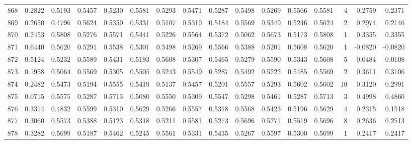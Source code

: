 \begin{tabular}{lrrrrrrrrrrrrrrr}
868 &      0.2822 &  0.5193 &  0.5457 &  0.5230 &  0.5581 &  0.5293 &  0.5471 &  0.5287 &  0.5498 &  0.5269 &   0.5566 &     0.5581 &      4 &                    0.2759 &                     0.2371 \\
869 &      0.2650 &  0.4796 &  0.5624 &  0.5350 &  0.5331 &  0.5107 &  0.5319 &  0.5184 &  0.5569 &  0.5349 &   0.5246 &     0.5624 &      2 &                    0.2974 &                     0.2146 \\
870 &      0.2453 &  0.5808 &  0.5276 &  0.5571 &  0.5441 &  0.5226 &  0.5564 &  0.5372 &  0.5062 &  0.5673 &   0.5173 &     0.5808 &      1 &                    0.3355 &                     0.3355 \\
871 &      0.6440 &  0.5620 &  0.5291 &  0.5538 &  0.5301 &  0.5498 &  0.5269 &  0.5566 &  0.5388 &  0.5201 &   0.5608 &     0.5620 &      1 &                   -0.0820 &                    -0.0820 \\
872 &      0.5124 &  0.5232 &  0.5589 &  0.5431 &  0.5193 &  0.5608 &  0.5307 &  0.5465 &  0.5279 &  0.5590 &   0.5343 &     0.5608 &      5 &                    0.0484 &                     0.0108 \\
873 &      0.1958 &  0.5064 &  0.5569 &  0.5305 &  0.5505 &  0.5243 &  0.5549 &  0.5287 &  0.5492 &  0.5222 &   0.5485 &     0.5569 &      2 &                    0.3611 &                     0.3106 \\
874 &      0.2482 &  0.5473 &  0.5194 &  0.5555 &  0.5419 &  0.5137 &  0.5457 &  0.5201 &  0.5557 &  0.5293 &   0.5602 &     0.5602 &     10 &                    0.3120 &                     0.2991 \\
875 &      0.0715 &  0.5575 &  0.5287 &  0.5713 &  0.5080 &  0.5550 &  0.5309 &  0.5547 &  0.5298 &  0.5461 &   0.5287 &     0.5713 &      3 &                    0.4998 &                     0.4860 \\
876 &      0.3314 &  0.4832 &  0.5599 &  0.5310 &  0.5629 &  0.5266 &  0.5557 &  0.5318 &  0.5568 &  0.5423 &   0.5196 &     0.5629 &      4 &                    0.2315 &                     0.1518 \\
877 &      0.3060 &  0.5573 &  0.5388 &  0.5123 &  0.5318 &  0.5211 &  0.5581 &  0.5273 &  0.5696 &  0.5271 &   0.5519 &     0.5696 &      8 &                    0.2636 &                     0.2513 \\
878 &      0.3282 &  0.5699 &  0.5187 &  0.5462 &  0.5245 &  0.5561 &  0.5331 &  0.5435 &  0.5267 &  0.5597 &   0.5300 &     0.5699 &      1 &                    0.2417 &                     0.2417 \\

\end{tabular}
